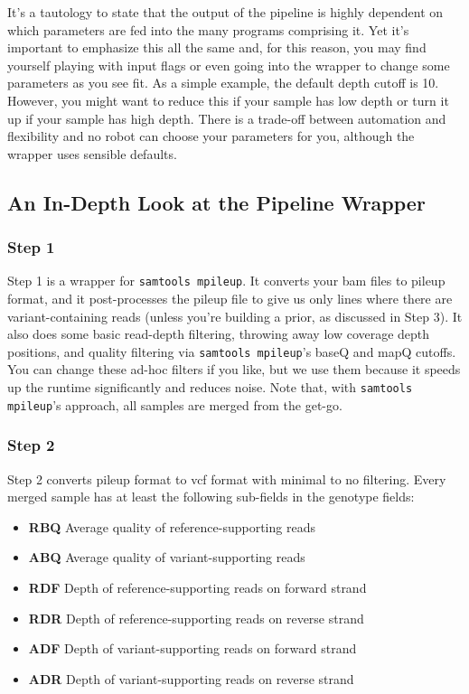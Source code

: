 \documentclass[letterpaper,14pt]{memoir}
\begin{document}
It's a tautology to state that the output of the pipeline is highly dependent on which parameters are fed into the many programs comprising it.
Yet it's important to emphasize this all the same and, for this reason, you may find yourself playing with input flags or even going into the wrapper to change some parameters as you see fit.
As a simple example, the default depth cutoff is 10.
However, you might want to reduce this if your sample has low depth or turn it up if your sample has high depth.
There is a trade-off between automation and flexibility and no robot can choose your parameters for you, although the wrapper uses sensible defaults.

\subsection{An In-Depth Look at the Pipeline Wrapper}\label{In Depth}

\subsubsection{Step 1}

Step 1 is a wrapper for \texttt{samtools mpileup}. 
It converts your bam files to pileup format, and it post-processes the pileup file to give us only lines where there are variant-containing reads (unless you're building a prior, as discussed in Step 3).
It also does some basic read-depth filtering, throwing away low coverage depth positions, and quality filtering via \texttt{samtools mpileup}'s baseQ and mapQ cutoffs.
You can change these ad-hoc filters if you like, but we use them because it speeds up the runtime significantly and reduces noise.
Note that, with \texttt{samtools mpileup}'s approach, all samples are merged from the get-go.

\subsubsection{Step 2}

Step 2 converts pileup format to vcf format with minimal to no filtering.
Every merged sample has at least the following sub-fields in the genotype fields:

\begin{itemize}
\tightlist
\item
  \textbf{RBQ} Average quality of reference-supporting reads
\item
  \textbf{ABQ} Average quality of variant-supporting reads
\item
  \textbf{RDF} Depth of reference-supporting reads on forward strand
\item
  \textbf{RDR} Depth of reference-supporting reads on reverse strand
\item
  \textbf{ADF} Depth of variant-supporting reads on forward strand
\item
  \textbf{ADR} Depth of variant-supporting reads on reverse strand
\end{itemize}
\end{document}
